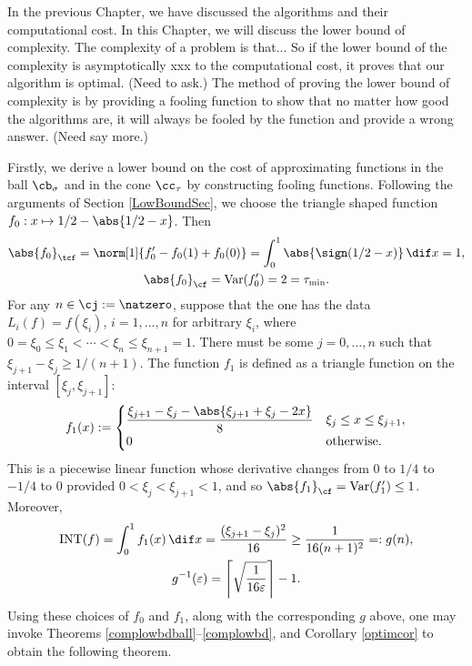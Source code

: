 \documentclass{iitthesis}
\DeclareMathOperator{\Var}{Var}
\DeclareMathOperator{\INT}{INT}
\theoremstyle{definition}
\theoremstyle{remark}
\newcommand{\Fnorm}[1]{\abs{#1}_{\cf}}
\newcommand{\Ftnorm}[1]{\abs{#1}_{\tcf}}
\begin{document}

In the previous Chapter, we have discussed the algorithms and their computational cost. In this Chapter, we will discuss the lower bound of complexity. The complexity of a problem is that... So if the lower bound of the complexity is asymptotically xxx to the computational cost, it proves that our algorithm is optimal. (Need to ask.) The method of proving the lower bound of complexity is by providing a fooling function to show that no matter how good the algorithms are, it will always be fooled by the function and provide a wrong answer. (Need say more.)

Firstly, we derive a lower bound on the cost of approximating functions in the ball $\cb_{\sigma}$ and in the cone $\cc_{\tau}$ by constructing fooling functions. Following the arguments of Section \ref{LowBoundSec}, we choose  the triangle shaped function $f_0: x \mapsto 1/2-\abs{1/2-x}$. Then
\begin{gather*}
\Ftnorm{f_0}=\norm[1]{f'_0-f_0(1)+f_0(0)}=\int_0^1 \abs{\sign(1/2-x)} \, \dif x = 1, \\ \Fnorm{f_0}=\Var(f'_0)=2= \tau_{\min}.
\end{gather*}
For any $n \in \cj:=\natzero$, suppose that the one has the data $L_i(f)=f(\xi_i)$, $i=1, \ldots, n$ for arbitrary $\xi_i$, where $0=\xi_0 \le \xi_1 < \cdots < \xi_n \le \xi_{n+1} = 1$.  There must be some $j=0, \ldots, n$ such that $\xi_{j+1} - \xi_j \ge 1/(n+1)$.  The function $f_{1}$ is defined as a triangle function on the interval $[\xi_j, \xi_{j+1}]$:
$$
f_{1}(x):=\begin{cases} \displaystyle
\frac{\xi_{j+1}-\xi_{j}-\abs{\xi_{j+1}+\xi_{j}-2x}}{8} & \xi_{j} \le x \leq \xi_{j+1},\\
0 & \text{otherwise}.
\end{cases}
$$
This is a piecewise linear function whose derivative changes from $0$ to $1/4$ to $-1/4$ to $0$ provided $0 < \xi_j < \xi_{j+1} < 1$, and so $\Fnorm{f_1}=\Var(f'_1)\le 1$. Moreover,
\begin{gather*}
\INT(f)=\int_0^1 f_1(x) \, \dif x = \frac{(\xi_{j+1} - \xi_j)^2}{16} \ge \frac{1}{16(n+1)^2} =: g(n),\\
g^{-1}(\varepsilon)=\left \lceil \sqrt{\frac{1}{16 \varepsilon}} \right \rceil - 1.
\end{gather*}
Using these choices of $f_0$ and $f_1$, along with the corresponding $g$ above, one may invoke Theorems \ref{complowbdball}--\ref{complowbd}, and Corollary \ref{optimcor} to obtain the following theorem.
\end{document}
